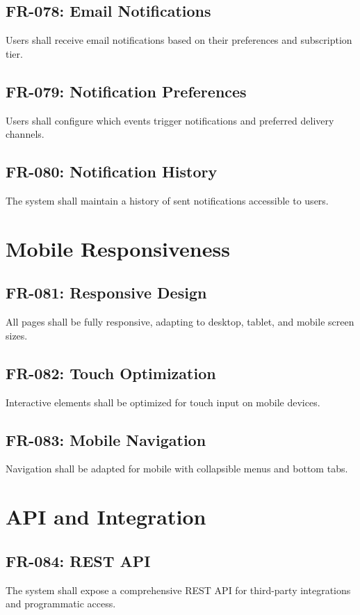 \documentclass{report}
\begin{document}
\subsection{FR-078: Email Notifications}
Users shall receive email notifications based on their preferences and subscription tier.

\subsection{FR-079: Notification Preferences}
Users shall configure which events trigger notifications and preferred delivery channels.

\subsection{FR-080: Notification History}
The system shall maintain a history of sent notifications accessible to users.

\section{Mobile Responsiveness}

\subsection{FR-081: Responsive Design}
All pages shall be fully responsive, adapting to desktop, tablet, and mobile screen sizes.

\subsection{FR-082: Touch Optimization}
Interactive elements shall be optimized for touch input on mobile devices.

\subsection{FR-083: Mobile Navigation}
Navigation shall be adapted for mobile with collapsible menus and bottom tabs.

\section{API and Integration}

\subsection{FR-084: REST API}
The system shall expose a comprehensive REST API for third-party integrations and programmatic access.
\end{document}
